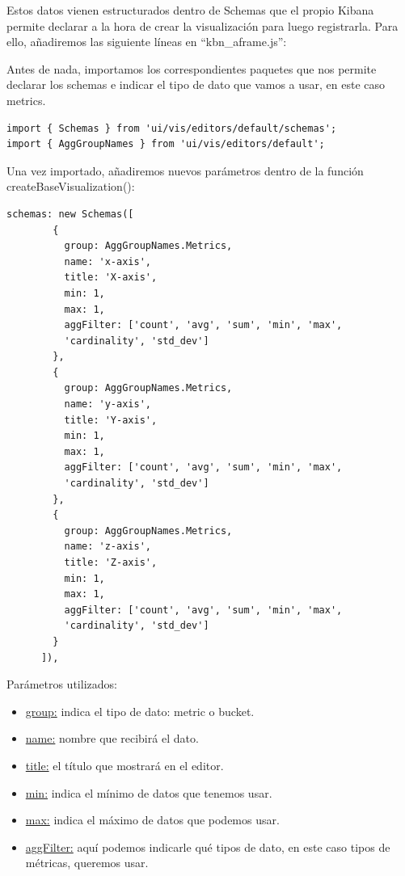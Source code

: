 \documentclass[a4paper, 12pt]{book}
\begin{document}
Estos datos vienen estructurados dentro de Schemas que el propio Kibana permite declarar a la hora de crear la visualización para luego registrarla. Para ello, añadiremos las siguiente líneas en “kbn\_aframe.js”:

Antes de nada, importamos los correspondientes paquetes que nos permite declarar los schemas e indicar el tipo de dato que vamos a usar, en este caso metrics.

\begin{lstlisting}[frame=single]
import { Schemas } from 'ui/vis/editors/default/schemas';
import { AggGroupNames } from 'ui/vis/editors/default';
\end{lstlisting}

Una vez importado, añadiremos nuevos parámetros dentro de la función createBaseVisualization():

\begin{lstlisting}[frame=single]
schemas: new Schemas([
        {
          group: AggGroupNames.Metrics,
          name: 'x-axis',
          title: 'X-axis',
          min: 1,
          max: 1,
          aggFilter: ['count', 'avg', 'sum', 'min', 'max', 
          'cardinality', 'std_dev']
        },
        {
          group: AggGroupNames.Metrics,
          name: 'y-axis',
          title: 'Y-axis',
          min: 1,
          max: 1,
          aggFilter: ['count', 'avg', 'sum', 'min', 'max', 
          'cardinality', 'std_dev']
        },
        {
          group: AggGroupNames.Metrics,
          name: 'z-axis',
          title: 'Z-axis',
          min: 1,
          max: 1,
          aggFilter: ['count', 'avg', 'sum', 'min', 'max', 
          'cardinality', 'std_dev']
        }
      ]),
\end{lstlisting}

Parámetros utilizados:
\begin{itemize}
    \item \underline{group:} indica el tipo de dato: metric o bucket.
    \item \underline{name:} nombre que recibirá el dato.
    \item \underline{title:} el título que mostrará en el editor.
    \item \underline{min:} indica el mínimo de datos que tenemos usar.
    \item \underline{max:} indica el máximo de datos que podemos usar.
    \item \underline{aggFilter:} aquí podemos indicarle qué tipos de dato, en este caso tipos de métricas, queremos usar.
\end{itemize}
\end{document}
